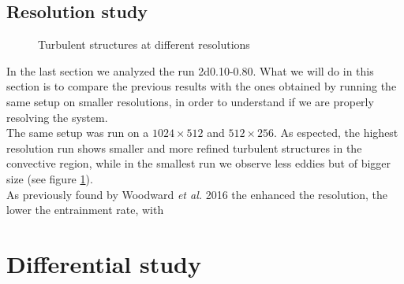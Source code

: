 \subsection{Resolution study}
\begin{figure}[b!]
  \centering
  \centering
      \hfill
	\caption{Turbulent structures at different resolutions}
    \label{fig:differentialmach}
 \end{figure}

In the last section we analyzed the run 2d0.10-0.80. What we will do in this section is to compare the previous results with the ones obtained by running the same setup on smaller resolutions, in order to understand if we are properly resolving the system. \\
The same setup was run on a $1024 \times 512$ and $512 \times 256$. As espected, the highest resolution run shows smaller and more refined turbulent structures in the convective region, while in the smallest run we observe less eddies but of bigger size (see figure \ref{fig:differentialmach}).\\
As previously found by Woodward \textit{et al.} 2016 \cite{woodward} the enhanced the resolution, the lower the entrainment rate, with 

\section{Differential study}
